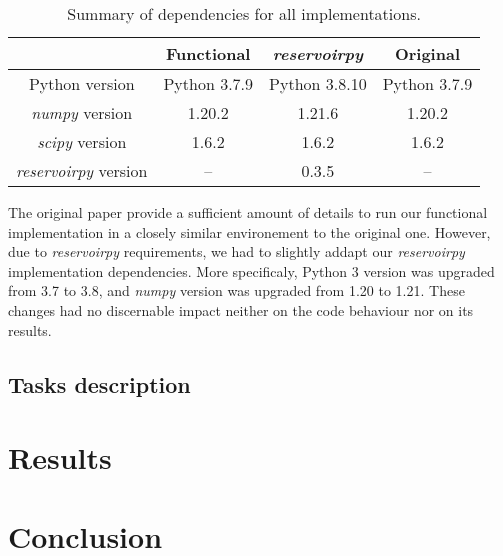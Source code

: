 \begin{table}[!h]
    \centering
    \begin{tabular}{cccc}
    \multicolumn{1}{l}{}         & Functional   & \emph{reservoirpy}   & Original     \\ \hline
    Python version               & Python 3.7.9 & Python 3.8.10        & Python 3.7.9 \\
    \emph{numpy} version         & 1.20.2       & 1.21.6               & 1.20.2       \\
    \emph{scipy} version         & 1.6.2        & 1.6.2                & 1.6.2        \\
    \emph{reservoirpy} version   & --           & 0.3.5                & --
    \end{tabular}
    \caption{Summary of dependencies for all implementations.}
    \label{tab:dependencies}
\end{table}

The original paper provide a sufficient amount of details to run our
functional implementation in a closely similar environement to the original one.
However, due to \emph{reservoirpy} requirements, we had to slightly addapt
our \emph{reservoirpy} implementation dependencies. More specificaly, Python 3
version was upgraded from 3.7 to 3.8, and \emph{numpy} version was upgraded
from 1.20 to 1.21. These changes had no discernable impact neither on the
code behaviour nor on its results.



\subsection{Tasks description}

\section{Results}

\section{Conclusion}
